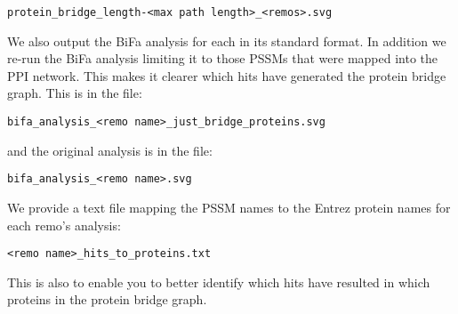 \documentclass[a4paper,11pt]{article}
\begin{document}
\begin{itemize}
\verb+protein_bridge_length-<max path length>_<remos>.svg+

We also output the BiFa analysis for each in its standard format. In addition we re-run the BiFa analysis limiting it to those PSSMs that were mapped into the PPI network. This makes it clearer which hits have generated the protein bridge graph. This is in the file:

\verb+bifa_analysis_<remo name>_just_bridge_proteins.svg+

and the original analysis is in the file:

\verb+bifa_analysis_<remo name>.svg+

We provide a text file mapping the PSSM names to the Entrez protein names for each remo's analysis:

\verb+<remo name>_hits_to_proteins.txt+

This is also to enable you to better identify which hits have resulted in which proteins in the protein bridge graph.


\end{itemize}
\end{document}
